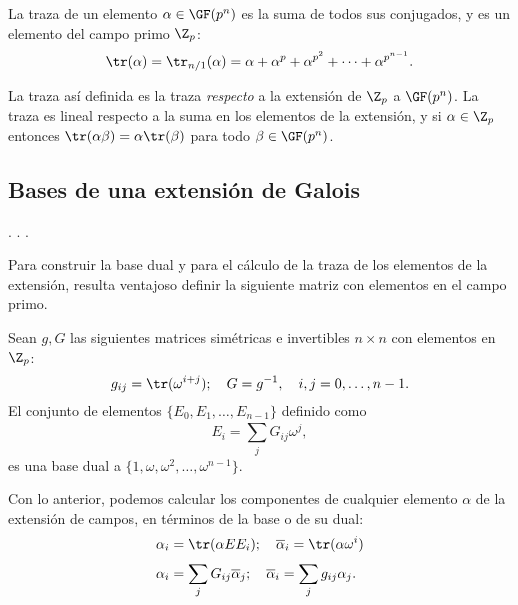   \begin{definition}
    La traza de un elemento $\alpha \in \GF(p^{n})$ es la
    suma de todos sus conjugados, y es un elemento del campo
    primo $\Z_p$:
    \begin{equation}
      \tr(\alpha)
      = \tr_{n / 1}(\alpha)
      = \alpha + \alpha^{p} + \alpha^{p^2} + \cdots +
      \alpha^{p^{n-1}}.
    \end{equation}
  \end{definition}
  La traza así definida es la traza \textit{respecto} a la
  extensión de $\Z_p$ a $\GF(p^{n})$. La traza es lineal
  respecto a la suma en los elementos de la extensión, y si
  $\alpha \in \Z_p$ entonces $\tr(\alpha\beta) =
  \alpha\tr(\beta)$ para todo $\beta \in \GF(p^{n})$.

  \subsection{Bases de una extensión de Galois}

  . . .

  Para construir la base dual y para el cálculo de la traza de
  los elementos de la extensión, resulta ventajoso definir
  la siguiente matriz con elementos en el campo primo.

  \begin{proposition}
    Sean $g,G$ las siguientes matrices simétricas e
    invertibles $n \times n$ con elementos en $\Z_p$:
    \begin{equation}
      g_{ij}
      = \tr(\omega^{i+j});
      \quad
      G = g^{-1},
      \quad
      i,j = 0,\ldots,n-1.
    \end{equation}
    El conjunto de elementos $\{E_0,E_1,\ldots,E_{n-1}\}$ 
    definido como
    \begin{equation}
      E_i = \sum_{j}^{} G_{ij} \omega^{j},
    \end{equation}
    es una base dual a
    $\{1,\omega,\omega^2,\ldots,\omega^{n-1}\}$.
  \end{proposition}

  Con lo anterior, podemos calcular los
  componentes de cualquier elemento $\alpha$ de la extensión
  de campos, en términos de la base o de su dual:
  \begin{align}
    \alpha_i
    &= \tr(\alpha E E_i);
    \quad
    \overline{\alpha}_i
    = \tr(\alpha \omega^{i}) \\
    \alpha_i 
    &= \sum_{j}^{} G_{ij} \overline{\alpha}_j;
    \quad
    \overline{\alpha}_i
    = \sum_{j}^{} g_{ij} \alpha_j.
  \end{align} 

